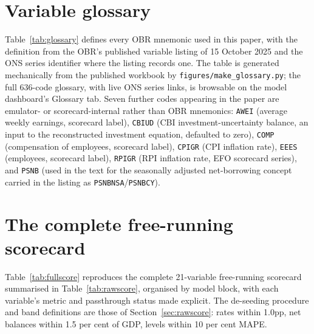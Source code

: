 \section{Variable glossary}
\label{app:glossary}

Table~\ref{tab:glossary} defines every OBR mnemonic used in this paper, with the definition from the OBR's published variable listing of 15 October 2025 and the ONS series identifier where the listing records one. The table is generated mechanically from the published workbook by \texttt{figures/\allowbreak make\_glossary.py}; the full 636-code glossary, with live ONS series links, is browsable on the model dashboard's Glossary tab. Seven further codes appearing in the paper are emulator- or scorecard-internal rather than OBR mnemonics: \texttt{AWEI} (average weekly earnings, scorecard label), \texttt{CBIUD} (CBI investment-uncertainty balance, an input to the reconstructed investment equation, defaulted to zero), \texttt{COMP} (compensation of employees, scorecard label), \texttt{CPIGR} (CPI inflation rate), \texttt{EEES} (employees, scorecard label), \texttt{RPIGR} (RPI inflation rate, EFO scorecard series), and \texttt{PSNB} (used in the text for the seasonally adjusted net-borrowing concept carried in the listing as \texttt{PSNBNSA}/\texttt{PSNBCY}).

{\small

}

\section{The complete free-running scorecard}
\label{app:scorecard}

Table~\ref{tab:fullscore} reproduces the complete 21-variable free-running scorecard summarised in Table~\ref{tab:rawscore}, organised by model block, with each variable's metric and passthrough status made explicit. The de-seeding procedure and band definitions are those of Section~\ref{sec:rawscore}: rates within 1.0pp, net balances within 1.5 per cent of GDP, levels within 10 per cent MAPE.

